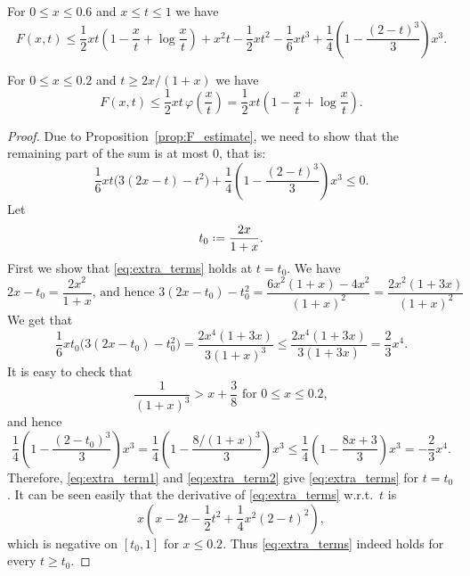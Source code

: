 \documentclass[10pt,a4paper]{amsart}
\newcommand{\defeq}{\mathrel{\vcenter{\baselineskip0.5ex \lineskiplimit0pt
                     \hbox{\scriptsize.}\hbox{\scriptsize.}}}%
                     =}
\begin{document}
\begin{proposition} \label{prop:F_estimate}
For $0 \leq x \leq 0.6$ and $x \leq t \leq 1$ we have 
%
\begin{equation*} 
F(x,t) \leq 
\frac12 xt \left( 1-\frac{x}{t} + \log\frac{x}{t} \right) 
+ x^2t -\frac12xt^2 - \frac16 xt^3 
+ \frac14 \left( 1- \frac{(2-t)^3}{3} \right)x^3 . 
\end{equation*}
%
\end{proposition}

\begin{proposition} \label{prop:F_main_term}
For $0 \leq x \leq 0.2$ and $t \geq 2x/(1+x)$ we have 
%
\begin{equation*} 
F(x,t) 
\leq \frac12 xt \, \varphi\left( \frac{x}{t} \right)
= \frac12 xt \left( 1-\frac{x}{t} + \log\frac{x}{t} \right) .
\end{equation*}
%
\end{proposition}

\begin{proof}
Due to Proposition~\ref{prop:F_estimate}, we need to show that the remaining part of the sum is at most $0$, that is:
%
\begin{equation} \label{eq:extra_terms}
\frac16xt \bigg( 3(2x-t) - t^2 \bigg) 
+ \frac14 \left( 1- \frac{(2-t)^3}{3} \right)x^3 \leq 0. 
\end{equation}
%
Let 
%
\[ t_0 \defeq \frac{2x}{1+x} .\]
%
First we show that \eqref{eq:extra_terms} holds at $t=t_0$. We have 
%
\[ 2x-t_0= \frac{2x^2}{1+x} 
\text{, and hence } 
3(2x-t_0)-t_0^2 = \frac{6x^2(1+x)-4x^2}{(1+x)^2} 
= \frac{2x^2(1+3x)}{(1+x)^2}
\]
%
We get that 
%
\begin{equation} \label{eq:extra_term1}
\frac16xt_0 \bigg( 3(2x-t_0) - t_0^2 \bigg) 
= \frac{2x^4(1+3x)}{3(1+x)^3} 
\leq \frac{2x^4(1+3x)}{3(1+3x)} 
= \frac23 x^4 .
\end{equation}
%
It is easy to check that   
%
\[ \frac{1}{(1+x)^3} > x + \frac38 
\text{ for } 0 \leq x \leq 0.2 ,\]
and hence 
%
\begin{equation} \label{eq:extra_term2}
\frac14 \left( 1- \frac{(2-t_0)^3}{3} \right)x^3 
= \frac14 \left( 1- \frac{8/(1+x)^3}{3} \right)x^3 
\leq \frac14 \left( 1- \frac{8x+3}{3} \right)x^3 
= - \frac23 x^4 .
\end{equation}
%
Therefore, \eqref{eq:extra_term1} and \eqref{eq:extra_term2} give \eqref{eq:extra_terms} for $t=t_0$. It can be seen easily that the derivative of \eqref{eq:extra_terms} w.r.t.~$t$ is
%
 \[ x \left( x-2t-\frac12 t^2 + \frac14 x^2(2-t)^2 \right) ,\]
%
which is negative on $[t_0,1]$ for $x \leq 0.2$. Thus \eqref{eq:extra_terms} indeed holds for every $t \geq t_0$.
%
\end{proof}
\end{document}
